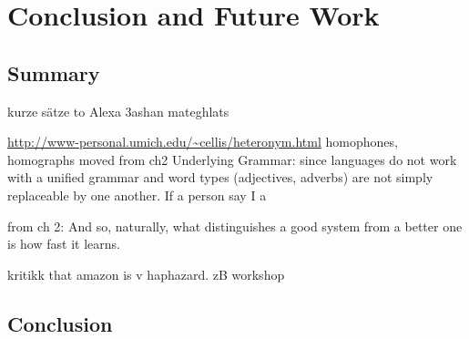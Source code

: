\chapter{Conclusion and Future Work}
\label{conclusion}
\section{Summary}


kurze sätze to Alexa 3ashan mateghlats

\url{http://www-personal.umich.edu/~cellis/heteronym.html}
	homophones, homographs
	moved from ch2 Underlying Grammar: since languages do not work with a unified grammar and word types (adjectives, adverbs) are not simply replaceable by one another. If a person say I a
	
	
	from ch 2:
	And so, naturally, what distinguishes a good system from a better one is how fast it learns.
	
	
	
	kritikk that amazon is v haphazard. zB workshop
\section{Conclusion}

